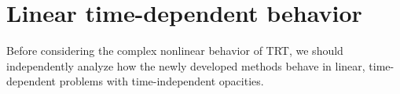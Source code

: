 %
%
%
%
%  
%
%  

\clearpage
\section{Linear time-dependent behavior}

Before considering the complex nonlinear behavior of TRT, we should
independently analyze how the newly developed methods behave in linear,
time-dependent problems with time-independent opacities.


